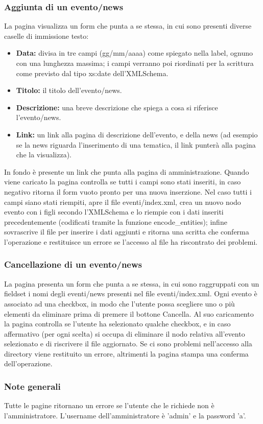 \documentclass[a4paper,10pt]{article}
\begin{document}
\subsubsection{Aggiunta di un evento/news}
La pagina visualizza un form che punta a se stessa, in cui sono presenti diverse caselle di immissione testo:
\begin{itemize}
\item \textbf{Data:} divisa in tre campi (gg/mm/aaaa) come spiegato nella label, ognuno con una lunghezza massima; i campi verranno poi riordinati per la scrittura come previsto dal tipo xs:date dell'XMLSchema.
\item \textbf{Titolo:} il titolo dell'evento/news.
\item \textbf{Descrizione:} una breve descrizione che spiega a cosa si riferisce l'evento/news.
\item \textbf{Link:} un link alla pagina di descrizione dell'evento, e della news (ad esempio se la news riguarda l'inserimento di una tematica, il link punter\`a alla pagina che la visualizza).
\end{itemize}
In fondo \`e presente un link che punta alla pagina di amministrazione.
Quando viene caricato la pagina controlla se tutti i campi sono stati inseriti, in caso negativo ritorna il form vuoto pronto per una nuova inserzione. Nel caso tutti i campi siano stati riempiti, apre il file eventi/index.xml, crea un nuovo nodo evento con i figli secondo l'XMLSchema e lo riempie con i dati inseriti precedentemente (codificati tramite la funzione encode{\_}entities); infine sovrascrive il file per inserire i dati aggiunti e ritorna una scritta che conferma l'operazione e restituisce un errore se l'accesso al file ha riscontrato dei problemi.

\subsubsection{Cancellazione di un evento/news}
La pagina presenta un form che punta a se stessa, in cui sono raggruppati con un fieldset i  nomi degli eventi/news presenti nel file eventi/index.xml. Ogni evento \`e associato ad una checkbox, in modo che l'utente possa scegliere uno o pi\`u elementi da eliminare prima di premere il bottone Cancella. Al suo caricamento la pagina controlla se l'utente ha selezionato qualche checkbox, e in caso affermativo (per ogni scelta) si occupa di eliminare il nodo relativa all'evento selezionato e di riscrivere il file aggiornato.
Se ci sono problemi nell'accesso alla directory viene restituito un errore, altrimenti la pagina stampa una conferma dell'operazione.

\subsubsection{Note generali}
Tutte le pagine ritornano un errore se l'utente che le richiede non \`e l'amministratore. L'username dell'amministratore \`e 'admin' e la password 'a'.
\end{document}
